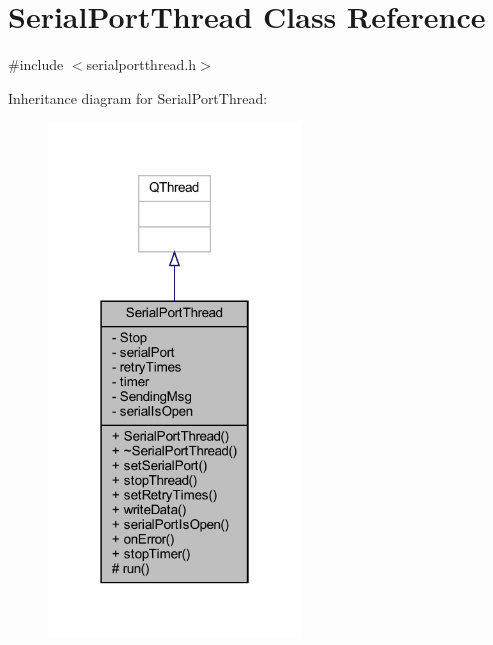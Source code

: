 \hypertarget{class_serial_port_thread}{}\section{Serial\+Port\+Thread Class Reference}
\label{class_serial_port_thread}


{\ttfamily \#include $<$serialportthread.\+h$>$}



Inheritance diagram for Serial\+Port\+Thread\+:
\nopagebreak
\begin{figure}[H]
\begin{center}
\leavevmode
\includegraphics[width=190pt]{class_serial_port_thread__inherit__graph}
\end{center}
\end{figure}


